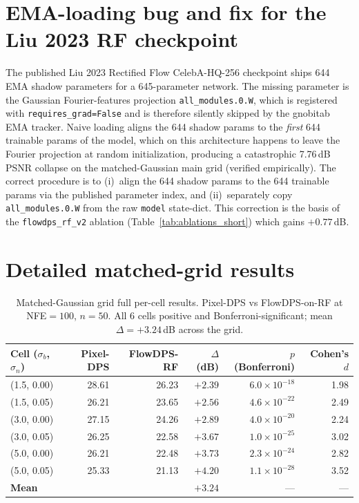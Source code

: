 \documentclass{article}
\begin{document}



\appendix

\section{EMA-loading bug and fix for the Liu 2023 RF checkpoint}
\label{app:ema}

The published Liu 2023 Rectified Flow CelebA-HQ-256 checkpoint ships
644 EMA shadow parameters for a 645-parameter network. The missing
parameter is the Gaussian Fourier-features projection
\texttt{all\_modules.0.W}, which is registered with
\texttt{requires\_grad=False} and is therefore silently skipped by the
gnobitab EMA tracker. Naive loading aligns the 644 shadow params to the
\emph{first} 644 trainable params of the model, which on this
architecture happens to leave the Fourier projection at random
initialization, producing a catastrophic 7.76\,dB PSNR collapse on the
matched-Gaussian main grid (verified empirically). The correct
procedure is to (i)~align the 644 shadow params to the 644 trainable
params via the published parameter index, and (ii)~separately copy
\texttt{all\_modules.0.W} from the raw \texttt{model} state-dict.
This correction is the basis of the \texttt{flowdps\_rf\_v2} ablation
(Table~\ref{tab:ablations_short}) which gains $+0.77$\,dB.

\section{Detailed matched-grid results}
\label{app:detailed_results}

\begin{table}[h]
  \centering
  \caption{Matched-Gaussian grid full per-cell results. Pixel-DPS vs
    FlowDPS-on-RF at NFE${=}100$, $n{=}50$. All 6 cells positive and
    Bonferroni-significant; mean $\Delta{=}{+}3.24$\,dB across the grid.}
  \label{tab:matched_gaussian_full}
  \begin{tabular}{lrrrrr}
    \toprule
    Cell ($\sigma_b$, $\sigma_n$) & Pixel-DPS & FlowDPS-RF & $\Delta$ (dB) & $p$ (Bonferroni) & Cohen's $d$ \\
    \midrule
    (1.5, 0.00) & 28.61 & 26.23 & $+2.39$ & $6.0\times10^{-18}$ & 1.98 \\
    (1.5, 0.05) & 26.21 & 23.65 & $+2.56$ & $4.6\times10^{-22}$ & 2.49 \\
    (3.0, 0.00) & 27.15 & 24.26 & $+2.89$ & $4.0\times10^{-20}$ & 2.24 \\
    (3.0, 0.05) & 26.25 & 22.58 & $+3.67$ & $1.0\times10^{-25}$ & 3.02 \\
    (5.0, 0.00) & 26.21 & 22.48 & $+3.73$ & $2.3\times10^{-24}$ & 2.82 \\
    (5.0, 0.05) & 25.33 & 21.13 & $+4.20$ & $1.1\times10^{-28}$ & 3.52 \\
    \midrule
    \textbf{Mean}  &       &       & $\boldsymbol{+3.24}$ & --- & --- \\
    \bottomrule
  \end{tabular}
\end{table}
\end{document}
